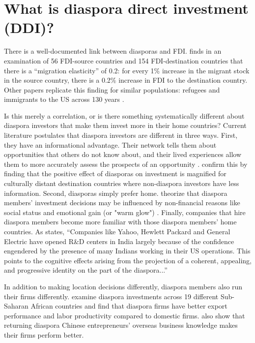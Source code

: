 \documentclass[doublespace,nopageskip]{UVAthesis}
\begin{document}
\section{What is diaspora direct investment (DDI)?} \label{ss:what_is_ddi?}

There is a well-documented link between diasporas and FDI. \citet{leblang_familiarity_2010} finds in an examination of 56 FDI-source countries and 154 FDI-destination countries that there is a ``migration elasticity'' of 0.2: for every 1\% increase in the migrant stock in the source country, there is a 0.2\% increase in FDI to the destination country. Other papers replicate this finding for similar populations: refugees and immigrants to the US across 130 years \citep{mayda_refugees_2022, burchardi_migrants_2019}.

Is this merely a correlation, or is there something systematically different about diaspora investors that make them invest more in their home countries? Current literature postulates that diaspora investors are different in three ways. First, they have an informational advantage. Their network tells them about opportunities that others do not know about, and their lived experiences allow them to more accurately assess the prospects of an opportunity \citep{leblang_familiarity_2010, useche_highly_2020}. \citet{kugler_migration_2018} confirm this by finding that the positive effect of diasporas on investment is magnified for culturally distant destination countries where non-diaspora investors have less information. Second, diasporas simply prefer home. \citet{nielsen_investing_2009} theorize that diaspora members' investment decisions may be influenced by non-financial reasons like social status and emotional gain (or "warm glow") \citep{andreoni_impure_1990}. Finally, companies that hire diaspora members become more familiar with those diaspora members' home countries. As \citet{kapur_diasporas_2001} states, ``Companies like Yahoo, Hewlett Packard and General Electric have opened R\&D centers in India largely because of the confidence engendered by the presence of many Indians working in their US operations. This points to the cognitive effects arising from the projection of a coherent, appealing, and progressive identity on the part of the diaspora...''

In addition to making location decisions differently, diaspora members also run their firms differently. \citet{boly_diaspora_2014} examine diaspora investments across 19 different Sub-Saharan African countries and find that diaspora firms have better export performance and labor productivity compared to domestic firms. \citet{liu_under_2019} also show that returning diaspora Chinese entrepreneurs' overseas business knowledge makes their firms perform better.
\end{document}
